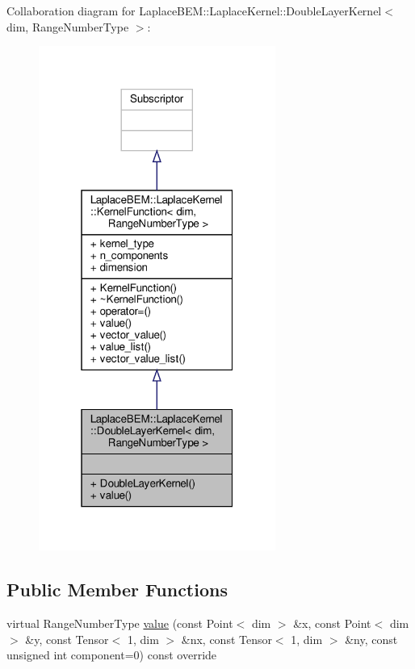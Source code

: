Collaboration diagram for Laplace\+B\+EM\+:\+:Laplace\+Kernel\+:\+:Double\+Layer\+Kernel$<$ dim, Range\+Number\+Type $>$\+:\nopagebreak
\begin{figure}[H]
\begin{center}
\leavevmode
\includegraphics[width=220pt]{classLaplaceBEM_1_1LaplaceKernel_1_1DoubleLayerKernel__coll__graph}
\end{center}
\end{figure}
\subsection*{Public Member Functions}
\begin{DoxyCompactItemize}
\item 
virtual Range\+Number\+Type \hyperlink{classLaplaceBEM_1_1LaplaceKernel_1_1DoubleLayerKernel_a44836d10e150f631a40d16dc2092fdad}{value} (const Point$<$ dim $>$ \&x, const Point$<$ dim $>$ \&y, const Tensor$<$ 1, dim $>$ \&nx, const Tensor$<$ 1, dim $>$ \&ny, const unsigned int component=0) const override
\end{DoxyCompactItemize}
